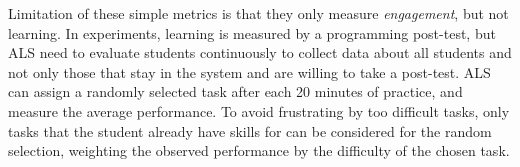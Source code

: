 Limitation of these simple metrics is that they only measure \emph{engagement},
but not learning.
In experiments, learning is measured by a programming post-test,
but ALS need to evaluate students continuously to collect data about
all students and not only those that stay in the system and are willing
to take a post-test.
ALS can assign a randomly selected task after each 20 minutes of practice,
and measure the average performance.
To avoid frustrating by too difficult tasks, only tasks that the student already have
skills for can be considered for the random selection,
weighting the observed performance by the difficulty of the chosen task.


%


